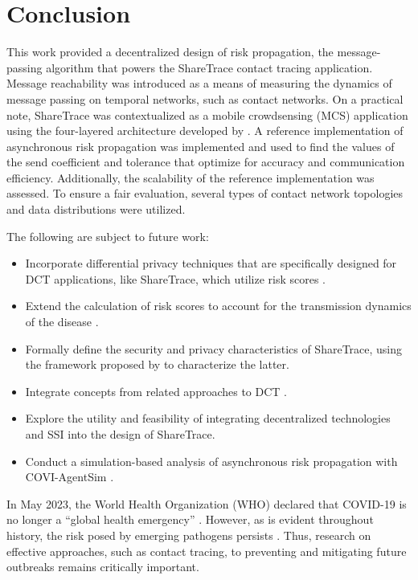 \chapter{Conclusion}\label{ch:conclusion}

This work provided a decentralized design of risk propagation, the message-passing algorithm that powers the ShareTrace contact tracing application. Message reachability was introduced as a means of measuring the dynamics of message passing on temporal networks, such as contact networks. On a practical note, ShareTrace was contextualized as a mobile crowdsensing (MCS) application using the four-layered architecture developed by \citet{Capponi2019}. A reference implementation of asynchronous risk propagation was implemented and used to find the values of the send coefficient and tolerance that optimize for accuracy and communication efficiency. Additionally, the scalability of the reference implementation was assessed. To ensure a fair evaluation, several types of contact network topologies and data distributions were utilized.

The following are subject to future work:
\begin{itemize}
  \item Incorporate differential privacy techniques that are specifically designed for DCT applications, like ShareTrace, which utilize risk scores \citep{Romijnders2024}.
  \item Extend the calculation of risk scores to account for the transmission dynamics of the disease \citep{Ferretti2020, Ferretti2024}.
  \item Formally define the security and privacy characteristics of ShareTrace, using the framework proposed by \citet{Kuhn2021} to characterize the latter.
  \item Integrate concepts from related approaches to DCT \citep{Reichert2020, Cho2020, Cherini2023, Gupta2023}.
  \item Explore the utility and feasibility of integrating decentralized technologies \citep{Benet2014, Troncoso2017, Trautwein2022, Shi2024, Keizer2024} and SSI \citep{Preukschat2021, Schardong2022} into the design of ShareTrace.
  \item Conduct a simulation-based analysis of asynchronous risk propagation with COVI-AgentSim \citep{Gupta2020}.
\end{itemize}

In May 2023, the World Health Organization (WHO) declared that COVID-19 is no longer a ``global health emergency'' \citep{Wise2023}. However, as is evident throughout history, the risk posed by emerging pathogens persists \citep{Piret2021, Tabish2022}. Thus, research on effective approaches, such as contact tracing, to preventing and mitigating future outbreaks remains critically important.